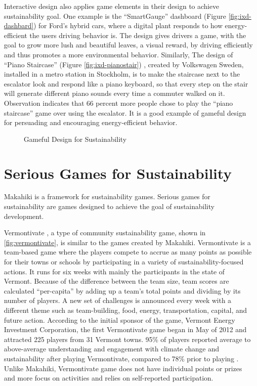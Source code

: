 Interactive design also applies game elements in their design to achieve sustainability goal. One example is the ``SmartGauge'' dashboard (Figure \autoref{fig:ixd-dashbard}) \cite {ideo2009} for Ford's hybrid cars, where a digital plant responds to how energy-efficient the users driving behavior is. The design gives drivers a game, with the goal to grow more lush and beautiful leaves, a visual reward, by driving efficiently and thus promotes a more environmental behavior. Similarly, The design of ``Piano Staircase'' (Figure \autoref{fig:ixd-pianostair}) \cite {funtheory2009}, created by Volkswagen Sweden, installed in a metro station in Stockholm, is to make the staircase next to the escalator look and respond like a piano keyboard, so that every step on the stair will generate different piano sounds every time a commuter walked on it. Observation indicates that 66 percent more people chose to play the ``piano staircase'' game over using the escalator. It is a good example of gameful design for persuading and encouraging energy-efficient behavior. 

 \begin{figure}[ht!]
	\centering
		\caption{Gameful Design for Sustainability}
		\label{fig:ixd}
\end{figure}	

\section{Serious Games for Sustainability}
\label{sec:rel-sg-sustainability}

Makahiki is a framework for sustainability games. Serious games for sustainability are games designed to achieve the goal of sustainability development.    

Vermontivate \cite{vermontivate}, a type of community sustainability game, shown in \autoref{fig:vermontivate}, is similar to the games created by Makahiki.  Vermontivate is a team-based game where  the players compete to accrue as many points as possible for their towns or schools by participating in a variety of sustainability-focused actions. It runs for six weeks with mainly the participants in the state of Vermont. Because of the difference between the team size, team scores are calculated ``per-capita'' by adding up a team's total points and dividing by its number of players. A new set of challenges is announced every week with a different theme such as team-building, food, energy, transportation, capital, and future action. According to the initial sponsor of the game, Vermont Energy Investment Corporation, the first Vermontivate game began in May of 2012 and attracted 225 players from 31 Vermont towns. 95\% of players reported average to above-average understanding and engagement with climate change and sustainability after playing Vermontivate, compared to 78\% prior to playing \cite{veic}. Unlike Makahiki, Vermontivate game does not have individual points or prizes and more focus on activities and relies on self-reported participation. 


